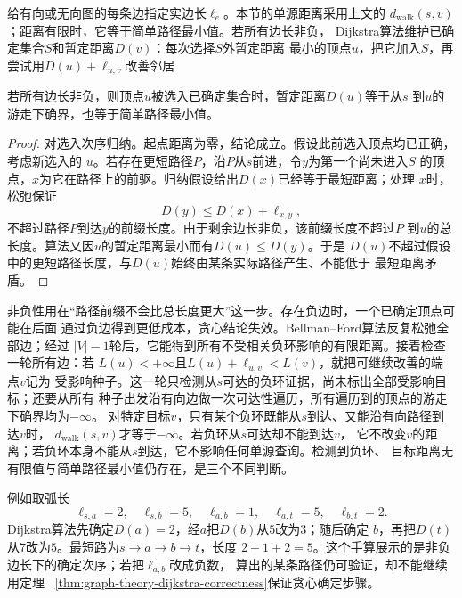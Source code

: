 给有向或无向图的每条边指定实边长\(\ell_e\)。本节的单源距离采用上文的
\(d_{\mathrm{walk}}(s,v)\)；距离有限时，它等于简单路径最小值。若所有边长非负，
Dijkstra算法维护已确定集合\(S\)和暂定距离\(D(v)\)：每次选择\(S\)外暂定距离
最小的顶点\(u\)，把它加入\(S\)，再尝试用\(D(u)+\ell_{u,v}\)改善邻居

\begin{theorem}[Dijkstra算法的贪心正确性]
  \label{thm:graph-theory-dijkstra-correctness}
  若所有边长非负，则顶点\(u\)被选入已确定集合时，暂定距离\(D(u)\)等于从\(s\)
  到\(u\)的游走下确界，也等于简单路径最小值。
\end{theorem}

\begin{proof}
对选入次序归纳。起点距离为零，结论成立。假设此前选入顶点均已正确，考虑新选入的
\(u\)。若存在更短路径\(P\)，沿\(P\)从\(s\)前进，令\(y\)为第一个尚未进入\(S\)
的顶点，\(x\)为它在路径上的前驱。归纳假设给出\(D(x)\)已经等于最短距离；处理
\(x\)时，松弛保证
\[
  D(y)\leq D(x)+\ell_{x,y},
\]
不超过路径\(P\)到达\(y\)的前缀长度。由于剩余边长非负，该前缀长度不超过\(P\)
到\(u\)的总长度。算法又因\(u\)的暂定距离最小而有\(D(u)\leq D(y)\)。于是
\(D(u)\)不超过假设中的更短路径长度，与\(D(u)\)始终由某条实际路径产生、不能低于
最短距离矛盾。
\end{proof}

非负性用在“路径前缀不会比总长度更大”这一步。存在负边时，一个已确定顶点可能在后面
通过负边得到更低成本，贪心结论失效。Bellman--Ford算法反复松弛全部边；经过
\(|V|-1\)轮后，它能得到所有不受相关负环影响的有限距离。接着检查一轮所有边：若
\(L(u)<+\infty\)且\(L(u)+\ell_{u,v}<L(v)\)，就把可继续改善的端点\(v\)记为
受影响种子。这一轮只检测从\(s\)可达的负环证据，尚未标出全部受影响目标；还要从所有
种子出发沿有向边做一次可达性遍历，所有遍历到的顶点的游走下确界均为\(-\infty\)。
对特定目标\(v\)，只有某个负环既能从\(s\)到达、又能沿有向路径到达\(v\)时，
\(d_{\mathrm{walk}}(s,v)\)才等于\(-\infty\)。若负环从\(s\)可达却不能到达\(v\)，
它不改变\(v\)的距离；若负环本身不能从\(s\)到达，它不影响任何单源查询。检测到负环、
目标距离无有限值与简单路径最小值仍存在，是三个不同判断。

例如取弧长
\[
  \ell_{s,a}=2,\quad \ell_{s,b}=5,\quad
  \ell_{a,b}=1,\quad \ell_{a,t}=5,\quad \ell_{b,t}=2.
\]
Dijkstra算法先确定\(D(a)=2\)，经\(a\)把\(D(b)\)从\(5\)改为\(3\)；随后确定
\(b\)，再把\(D(t)\)从\(7\)改为\(5\)。最短路为\(s\to a\to b\to t\)，长度
\(2+1+2=5\)。这个手算展示的是非负边长下的确定次序；若把\(\ell_{a,b}\)改成负数，
算出的某条路径仍可验证，却不能继续用定理
~\ref{thm:graph-theory-dijkstra-correctness}保证贪心确定步骤。

